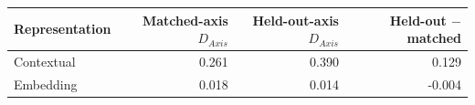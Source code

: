 \begin{tabular}{@{}lrrr@{}}
\toprule
Representation & Matched-axis $D_{Axis}$ & Held-out-axis $D_{Axis}$ & Held-out $-$ matched \\
\midrule
Contextual & 0.261 & 0.390 & 0.129 \\
Embedding & 0.018 & 0.014 & -0.004 \\
\bottomrule
\end{tabular}
